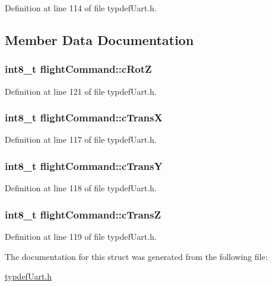 Definition at line 114 of file typdef\-Uart.\-h.



\subsection{Member Data Documentation}
\hypertarget{structflightCommand_a8747d9907a0b26163b4fead3712797eb}{
\subsubsection[{c\-Rot\-Z}]{\setlength{\rightskip}{0pt plus 5cm}int8\-\_\-t flight\-Command\-::c\-Rot\-Z}}\label{structflightCommand_a8747d9907a0b26163b4fead3712797eb}


Definition at line 121 of file typdef\-Uart.\-h.

\hypertarget{structflightCommand_af700666e91aa7b7d619640bc75b9b907}{
\subsubsection[{c\-Trans\-X}]{\setlength{\rightskip}{0pt plus 5cm}int8\-\_\-t flight\-Command\-::c\-Trans\-X}}\label{structflightCommand_af700666e91aa7b7d619640bc75b9b907}


Definition at line 117 of file typdef\-Uart.\-h.

\hypertarget{structflightCommand_a4ec008f3e964d4e8ff8f700e4ec8d54a}{
\subsubsection[{c\-Trans\-Y}]{\setlength{\rightskip}{0pt plus 5cm}int8\-\_\-t flight\-Command\-::c\-Trans\-Y}}\label{structflightCommand_a4ec008f3e964d4e8ff8f700e4ec8d54a}


Definition at line 118 of file typdef\-Uart.\-h.

\hypertarget{structflightCommand_abe6fac04c37189e2310de28de7df01d0}{
\subsubsection[{c\-Trans\-Z}]{\setlength{\rightskip}{0pt plus 5cm}int8\-\_\-t flight\-Command\-::c\-Trans\-Z}}\label{structflightCommand_abe6fac04c37189e2310de28de7df01d0}


Definition at line 119 of file typdef\-Uart.\-h.



The documentation for this struct was generated from the following file\-:\begin{DoxyCompactItemize}
\item 
\hyperlink{typdefUart_8h}{typdef\-Uart.\-h}\end{DoxyCompactItemize}
